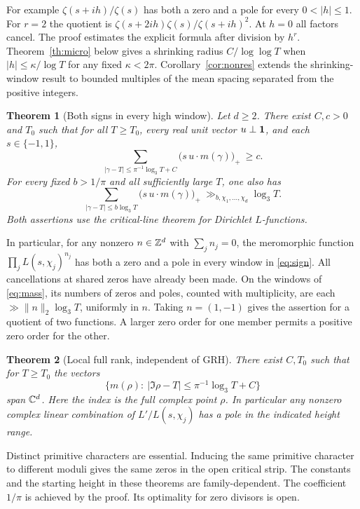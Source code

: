 \documentclass[11pt]{article}
\newtheorem{theorem}{Theorem}
\newcommand{\lthree}{\log_3 T}
\begin{document}
For example $\zeta(s+ih)/\zeta(s)$ has both a zero and a pole for every
$0<|h|\le1$. For $r=2$ the quotient is
$\zeta(s+2ih)\zeta(s)/\zeta(s+ih)^2$. At $h=0$ all factors cancel.
The proof estimates the explicit formula after division by $h^r$.
Theorem~\ref{th:micro} below gives a shrinking radius $C/\log\log T$
when $|h|\le\kappa/\log T$ for any fixed $\kappa<2\pi$. Corollary~\ref{cor:nonres} extends the shrinking-window result to bounded multiples of the mean spacing separated from the positive integers.

\begin{theorem}[Both signs in every high window]\label{th:sign}
Let $d\ge2$. There exist $C,c>0$ and $T_0$ such that for all $T\ge T_0$,
every real unit vector $u\perp\mathbf 1$, and each $s\in\{-1,1\}$,
\begin{equation}
 \sum_{|\gamma-T|\le \pi^{-1}\lthree+C}
      \big(s\, u\cdot m(\gamma)\big)_+\ \ge c .
 \label{eq:sign}
\end{equation}
For every fixed $b>1/\pi$ and all sufficiently large $T$, one also has
\begin{equation}
 \sum_{|\gamma-T|\le b\lthree}
      \big(s\, u\cdot m(\gamma)\big)_+\ \gg_{b,\chi_1,\ldots,\chi_d} \lthree .
 \label{eq:mass}
\end{equation}
Both assertions use the critical-line theorem for Dirichlet $L$-functions.
\end{theorem}

In particular, for any nonzero $n\in\mathbb Z^d$ with $\sum_j n_j=0$, the
meromorphic function $\prod_j L(s,\chi_j)^{n_j}$ has both a zero and a pole
in every window in \eqref{eq:sign}. All cancellations at shared zeros have
already been made. On the windows of \eqref{eq:mass}, its numbers of zeros and
poles, counted with multiplicity, are each $\gg \|n\|_2\lthree$, uniformly in
$n$. Taking $n=(1,-1)$ gives the assertion for a quotient of two functions.
A larger zero order for one member permits a positive zero order for the other.

\begin{theorem}[Local full rank, independent of GRH]\label{th:rank}
There exist $C,T_0$ such that for $T\ge T_0$ the vectors
\[
 \big\{m(\rho):\ |\Im\rho-T|\le \pi^{-1}\lthree+C\big\}
\]
span $\mathbb C^d$. Here the index is the full complex point $\rho$. In particular any
nonzero complex linear combination of $L'/L(s,\chi_j)$ has a pole in the
indicated height range.
\end{theorem}
Distinct primitive characters are essential. Inducing the same primitive
character to different moduli gives the same zeros in the open critical strip.
The constants and the starting height in these theorems are family-dependent.
The coefficient $1/\pi$ is achieved by the proof. Its optimality for zero
divisors is open.
\end{document}
